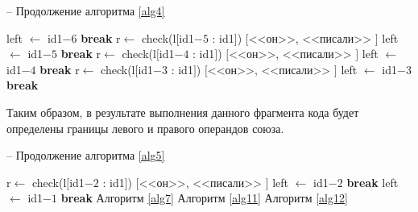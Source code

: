\documentclass[main]{subfiles}
\begin{document}
\begin{algorithm}
	\caption{-- Продолжение алгоритма \ref{alg4}}\label{alg5}
	\begin{algorithmic}[1]
		\State left $\gets$ id1$-6$ 
		\State \textbf{break}
		\EndIf
		\EndIf
		\EndFor
		\EndIf
		\State r$\gets$ check(l$[$id1$-5$ : id1$]$)
		\State \Return $[$<<он>>, <<писали>> $]$
		\State left $\gets$ id1$-5$ 
		\State \textbf{break}
		\EndIf
		\EndIf
		\EndFor
		\EndIf
		\State r$\gets$ check(l$[$id1$-4$ : id1$]$)
		\State \Return $[$<<он>>, <<писали>> $]$
		\State left $\gets$ id1$-4$ 
		\State \textbf{break}
		\EndIf
		\EndIf
		\EndFor
		\EndIf
		\State r$\gets$ check(l$[$id1$-3$ : id1$]$)
\State \Return $[$<<он>>, <<писали>> $]$
\State left $\gets$ id1$-3$ 
\State \textbf{break}
\EndIf
\EndIf
\EndFor
		\EndIf
	\end{algorithmic}
\end{algorithm}
Таким образом, в результате выполнения данного фрагмента кода будет определены границы левого и правого операндов союза.
\begin{algorithm}
	\caption{-- Продолжение алгоритма \ref{alg5}}\label{alg6}
	\begin{algorithmic}[1]
		\State r$\gets$ check(l$[$id1$-2$ : id1$]$)
		\State \Return $[$<<он>>, <<писали>> $]$
		\State left $\gets$ id1$-2$ 
		\State \textbf{break}
		\EndIf
		\EndIf
		\EndFor
		\EndIf
		\State left $\gets$ id1$-1$
		\State \textbf{break}
		\EndIf
		\EndFor
		\EndIf
		\EndIf
		\State Алгоритм \ref{alg7}
		\State Алгоритм \ref{alg11}
		\State Алгоритм \ref{alg12}
		\EndFunction
	\end{algorithmic}
\end{algorithm}
\end{document}
